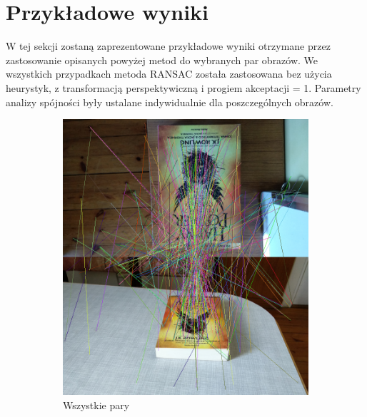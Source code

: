 \documentclass{article}
\begin{document}
	\section{Przykładowe wyniki}
	W tej sekcji zostaną zaprezentowane przykładowe wyniki otrzymane przez zastosowanie opisanych powyżej metod do wybranych par obrazów. We wszystkich przypadkach metoda RANSAC została zastosowana bez użycia heurystyk, z transformacją perspektywiczną i progiem akceptacji = 1. Parametry analizy spójności były ustalane indywidualnie dla poszczególnych obrazów.
	\begin{figure}[H]
		\centering
		\begin{subfigure}[b]{0.4\linewidth}
			\includegraphics[width=\linewidth]{k1a.png}
			\caption{Wszystkie pary}
		\end{subfigure}
		\begin{subfigure}[b]{0.4\linewidth}

\end{subfigure}
\end{figure}
\end{document}
